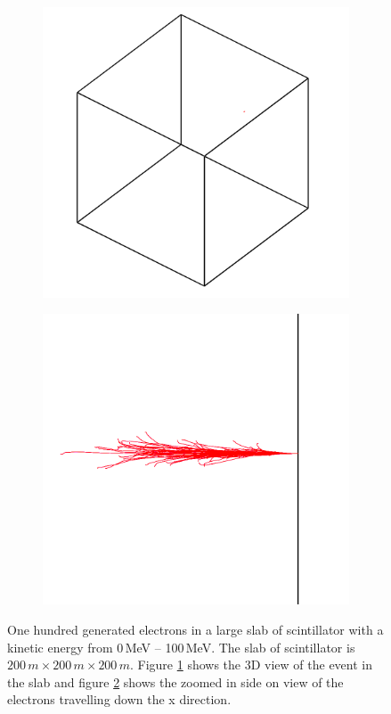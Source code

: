 \begin{figure}[!h]
\centering
\begin{subfigure}{.5\textwidth}
  \centering
  \includegraphics[width=0.7\linewidth]{Chapter4/Figs/newSlab3d950By900Red.png}
  \captionsetup{width=.9\linewidth}
  \caption{}
  \label{subFig:electronsSlab3d}
\end{subfigure}%
\begin{subfigure}{.5\textwidth}
  \centering
  \includegraphics[width=0.7\linewidth]{Chapter4/Figs/newSlabSideOnView950By900Red.png}
  \captionsetup{width=.9\linewidth}
  \caption{}
  \label{subFig:electronsSlabSideOn}
\end{subfigure}
\caption[One hundred generated electrons in a large slab of scintillator.]{One hundred generated electrons in a large slab of scintillator with a kinetic energy from 0\,MeV -- 100\,MeV. The slab of scintillator is $200\,m \times 200\,m \times 200\,m$. Figure \ref{subFig:electronsSlab3d} shows the 3D view of the event in the slab and figure \ref{subFig:electronsSlabSideOn} shows the zoomed in side on view of the electrons travelling down the x direction.}
\label{fig:electrons_viewed_in_slab}
\end{figure}

